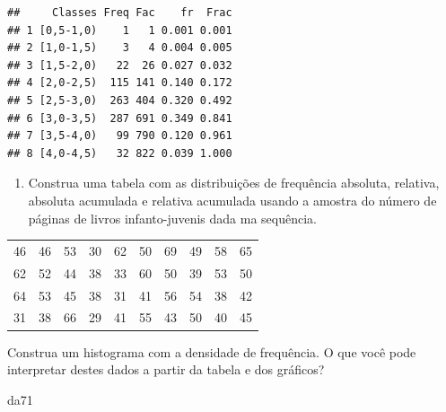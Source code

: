 \documentclass[]{article}
\newenvironment{Shaded}{\begin{snugshade}}{\end{snugshade}}
\newcommand{\CommentTok}[1]{\textcolor[rgb]{0.56,0.35,0.01}{\textit{#1}}}
\newcommand{\NormalTok}[1]{#1}
\providecommand{\tightlist}{%
  \setlength{\itemsep}{0pt}\setlength{\parskip}{0pt}}
\begin{document}
\begin{verbatim}
##     Classes Freq Fac    fr  Frac
## 1 [0,5-1,0)    1   1 0.001 0.001
## 2 [1,0-1,5)    3   4 0.004 0.005
## 3 [1,5-2,0)   22  26 0.027 0.032
## 4 [2,0-2,5)  115 141 0.140 0.172
## 5 [2,5-3,0)  263 404 0.320 0.492
## 6 [3,0-3,5)  287 691 0.349 0.841
## 7 [3,5-4,0)   99 790 0.120 0.961
## 8 [4,0-4,5)   32 822 0.039 1.000
\end{verbatim}

\begin{Shaded}
\end{Shaded}

\begin{enumerate}
\def\labelenumi{\arabic{enumi}.}
\setcounter{enumi}{6}
\tightlist
\item
  Construa uma tabela com as distribuições de frequência absoluta,
  relativa, absoluta acumulada e relativa acumulada usando a amostra do
  número de páginas de livros infanto-juvenis dada ma sequência.
\end{enumerate}

\begin{table}[H]
\centering
\begin{tabular}{cccccccccc}
\cline{1-10}
46 & 46 & 53 & 30 & 62 & 50 & 69 & 49 & 58 & 65 \\
62 & 52 & 44 & 38 & 33 & 60 & 50 & 39 & 53 & 50 \\
64 & 53 & 45 & 38 & 31 & 41 & 56 & 54 & 38 & 42 \\
31 & 38 & 66 & 29 & 41 & 55 & 43 & 50 & 40 & 45 \\ \cline{1-10}
\end{tabular}
\end{table}

Construa um histograma com a densidade de frequência. O que você pode
interpretar destes dados a partir da tabela e dos gráficos?

\begin{Shaded}
\begin{Highlighting}[]
\NormalTok{da71}
\end{Highlighting}
\end{Shaded}
\end{document}
